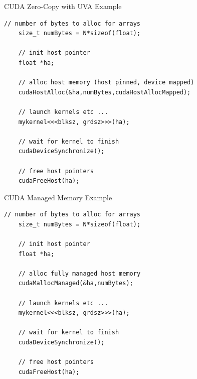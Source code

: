 \documentclass{beamer}
\begin{document}
\begin{frame}[fragile]{CUDA Zero-Copy with UVA Example}
\begin{lstlisting}[caption={Using cudaHostAlloc allows CUDA kernels to read and write host memory addresses.  With UVA in effect (introduced in CUDA 4.0), host pointers can be directly passed to kernel launch.  Again, only use zero-copy strategy with small amounts of data since the data is not cached on the GPU.}]
    // number of bytes to alloc for arrays
    size_t numBytes = N*sizeof(float);

    // init host pointer
    float *ha;

    // alloc host memory (host pinned, device mapped)
    cudaHostAlloc(&ha,numBytes,cudaHostAllocMapped);

    // launch kernels etc ...
    mykernel<<<blksz, grdsz>>>(ha);

    // wait for kernel to finish
    cudaDeviceSynchronize();

    // free host pointers
    cudaFreeHost(ha);
\end{lstlisting}
\end{frame}

\begin{frame}[fragile]{CUDA Managed Memory Example}
\begin{lstlisting}[caption={Using cudaMallocManaged (introduced in CUDA 6.0) eliminates all explicit memory copies.  Thanks to UVA, host pointers can be passed directly to kernal launch.  Unlike zero-copy,  using managed memory is generally quite scalable since the driver will automatically migrate the necessary data back and forth between host and device.}]
    // number of bytes to alloc for arrays
    size_t numBytes = N*sizeof(float);

    // init host pointer
    float *ha;

    // alloc fully managed host memory
    cudaMallocManaged(&ha,numBytes);

    // launch kernels etc ...
    mykernel<<<blksz, grdsz>>>(ha);

    // wait for kernel to finish
    cudaDeviceSynchronize();

    // free host pointers
    cudaFreeHost(ha);
\end{lstlisting}
\end{frame}
\end{document}
